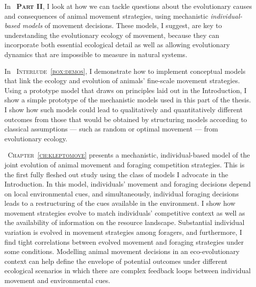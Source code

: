 
\medskip

In {\scshape~\textbf{Part II}}, I look at how we can tackle questions about the evolutionary causes and consequences of animal movement strategies, using mechanistic \textit{individual-based models} of movement decisions.
These models, I suggest, are key to understanding the evolutionary ecology of movement, because they can incorporate both essential ecological detail as well as allowing evolutionary dynamics that are impossible to measure in natural systems.

\medskip

In {\scshape~Interlude~\ref{box:demos}}, I demonstrate how to implement conceptual models that link the ecology and evolution of animals' fine-scale movement strategies.
Using a prototype model that draws on principles laid out in the Introduction, I show a simple prototype of the mechanistic models used in this part of the thesis.
I show how such models could lead to qualitatively and quantitatively different outcomes from those that would be obtained by structuring models according to classical assumptions --- such as random or optimal movement --- from evolutionary ecology.

\medskip

{\scshape~Chapter~\ref{ch:kleptomove}} presents a mechanistic, individual-based model of the joint evolution of animal movement and foraging competition strategies.
This is the first fully fleshed out study using the class of models I advocate in the {Introduction}.
In this model, individuals' movement and foraging decisions depend on local environmental cues, and simultaneously, individual foraging decisions leads to a restructuring of the cues available in the environment.
I show how movement strategies evolve to match individuals' competitive context as well as the availability of information on the resource landscape.
Substantial individual variation is evolved in movement strategies among foragers, and furthermore, I find tight correlations between evolved movement and foraging strategies under some conditions.
Modelling animal movement decisions in an eco-evolutionary context can help define the envelope of potential outcomes under different ecological scenarios in which there are complex feedback loops between individual movement and environmental cues.

